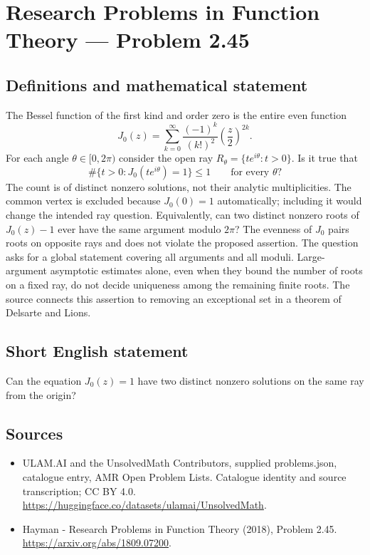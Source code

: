 \documentclass[11pt,a4paper]{article}
\begin{document}
\section*{Research Problems in Function Theory — Problem 2.45}\label{statement}

\subsection{Definitions and mathematical statement}
The Bessel function of the first kind and order zero is the entire even function
\[
J_0(z)=\sum_{k=0}^{\infty}\frac{(-1)^k}{(k!)^2}\left(\frac z2\right)^{2k}.
\]
For each angle $\theta\in[0,2\pi)$ consider the open ray
$R_\theta=\{te^{i\theta}:t>0\}$. Is it true that
\[
\#\{t>0:J_0(te^{i\theta})=1\}\le1
\qquad\text{for every }\theta?
\]
The count is of distinct nonzero solutions, not their analytic multiplicities. The common vertex is excluded because $J_0(0)=1$ automatically; including it would change the intended ray question. Equivalently, can two distinct nonzero roots of $J_0(z)-1$ ever have the same argument modulo $2\pi$? The evenness of $J_0$ pairs roots on opposite rays and does not violate the proposed assertion.
The question asks for a global statement covering all arguments and all moduli. Large-argument asymptotic estimates alone, even when they bound the number of roots on a fixed ray, do not decide uniqueness among the remaining finite roots. The source connects this assertion to removing an exceptional set in a theorem of Delsarte and Lions.
\subsection{Short English statement}
Can the equation $J_0(z)=1$ have two distinct nonzero solutions on the same ray from the origin?
\subsection{Sources}
\begin{itemize}
\item[S1] ULAM.AI and the UnsolvedMath Contributors, supplied problems.json, catalogue entry, AMR Open Problem Lists. Catalogue identity and source transcription; CC BY 4.0.
\url{https://huggingface.co/datasets/ulamai/UnsolvedMath}.
\item[S2] Hayman - Research Problems in Function Theory (2018), Problem 2.45. 
\url{https://arxiv.org/abs/1809.07200}.
\end{itemize}
\end{document}
